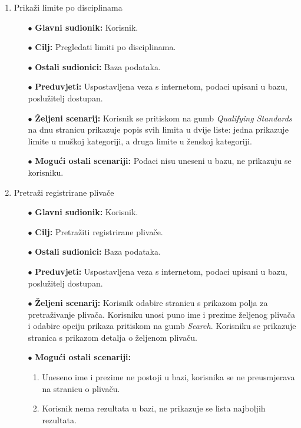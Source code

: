 \documentclass[times, utf8, zavrsni]{fer}
\begin{document}
\begin{enumerate}
    \item Prikaži limite po disciplinama
    \begin{itemize}
        \item[$\bullet$] \textbf{Glavni sudionik:} Korisnik.
        \item[$\bullet$] \textbf{Cilj:} Pregledati limiti po disciplinama.
        \item[$\bullet$] \textbf{Ostali sudionici:} Baza podataka.
        \item[$\bullet$] \textbf{Preduvjeti:} Uspostavljena veza s internetom, podaci upisani u bazu, poslužitelj dostupan.
        \item[$\bullet$] \textbf{Željeni scenarij:} Korisnik se pritiskom na gumb \textit{Qualifying Standards} na dnu stranicu prikazuje
        popis svih limita u dvije liste: jedna prikazuje limite u muškoj kategoriji, a druga limite u ženskoj kategoriji.
        \item[$\bullet$] \textbf{Mogući ostali scenariji:} Podaci nisu uneseni u bazu, ne prikazuju se korisniku.
    \end{itemize}


    \item Pretraži registrirane plivače
    \begin{itemize}
        \item[$\bullet$] \textbf{Glavni sudionik:} Korisnik.
        \item[$\bullet$] \textbf{Cilj:} Pretražiti registrirane plivače.
        \item[$\bullet$] \textbf{Ostali sudionici:} Baza podataka.
        \item[$\bullet$] \textbf{Preduvjeti:} Uspostavljena veza s internetom, podaci upisani u bazu, poslužitelj dostupan.
        \item[$\bullet$] \textbf{Željeni scenarij:} Korisnik odabire stranicu s prikazom polja za pretraživanje plivača. Korisniku unosi puno
        ime i prezime željenog plivača i odabire opciju prikaza pritiskom na gumb \textit{Search}. Korisniku se prikazuje stranica s prikazom detalja o
        željenom plivaču.
        \item[$\bullet$] \textbf{Mogući ostali scenariji:} 
        \begin{enumerate}
            \item Uneseno ime i prezime ne postoji u bazi, korisnika se ne preusmjerava na stranicu o plivaču.
            \item Korisnik nema rezultata u bazi, ne prikazuje se lista najboljih rezultata.
        \end{enumerate}
    \end{itemize}



\end{enumerate}
\end{document}
